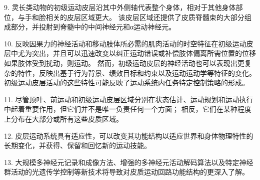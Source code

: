 9. 灵长类动物的初级运动皮层沿其中外侧轴代表整个身体，相对于其他身体部位，与手和脸相关的皮层区域更大。 该皮层区域还提供了皮质脊髓束的大部分组成部分，并投射到脊髓中的中间神经元和α运动神经元。

10. 反映因果力的神经活动和移动肢体所必需的肌肉活动的时空特征在初级运动皮层中尤为突出，并且可以迅速改变以纠正运动错误或补偿肢体偏离所需位置的位移 如果肢体受到扰动，则运动。 然而，初级运动皮层的神经活动也可以表现出更复杂的特性，反映出基于行为背景、绩效目标和约束以及运动运动学等特征的变化。 初级运动皮层活动的这些特性可能反映了运动系统内任务特定控制策略的形成。

11. 尽管顶叶、前运动和初级运动皮层区域分别在状态估计、运动规划和运动执行中起着重要作用，但它们并不是唯一负责任何一个方面； 相反，它们在某种程度上分布在大部分或所有这些皮质区域。

12. 皮层运动系统具有适应性，可以改变其功能结构以适应世界和身体物理特性的长期变化，并获得、保留和回忆新的运动技能。

13. 大规模多神经元记录和成像方法、增强的多神经元活动解码算法以及特定神经群活动的光遗传学控制等新技术将导致对皮质运动回路功能结构的更深入了解。

